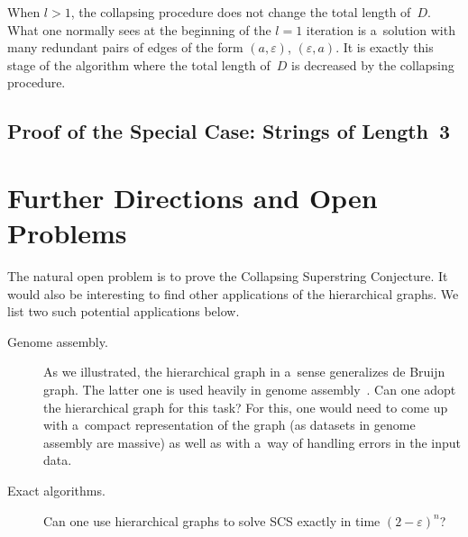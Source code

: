 \documentclass[11pt,letterpaper]{article}
\begin{document}
When $l>1$, the collapsing procedure does not change the total length of~$D$. 
What one normally sees at the beginning of the
$l=1$ iteration is a~solution with many 
redundant pairs of edges of the form $(a, \varepsilon)$, $(\varepsilon, a)$. It is exactly this stage of the algorithm where the total length of~$D$ is decreased by the collapsing procedure.

\subsection{Proof of the Special Case: Strings of Length~3}\label{subsec:scs3}



\section{Further Directions and Open Problems}
The natural open problem is to prove the Collapsing Superstring Conjecture.
It would also be interesting to find other applications of the 
hierarchical graphs. We list two such potential applications below.
\begin{description}
\item[Genome assembly.] As we illustrated, the hierarchical graph in a~sense
generalizes de Bruijn graph. The latter one is used heavily 
in genome assembly~\cite{}.
Can one adopt the hierarchical graph for this task? For this, one
would need to come up with a~compact representation of the graph
(as datasets in genome assembly are massive) as well as with a~way of
handling errors in the input data.

\item[Exact algorithms.] Can one use hierarchical graphs to solve SCS exactly in time $(2-\varepsilon)^n$?
\end{description}
\end{document}
